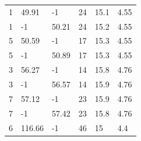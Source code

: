 \begin{table}[h!]
\begin{tabular*}{\linewidth}{p{45pt}<{\centering}p{65pt}<{\centering}
p{65pt}<{\centering}p{45pt}<{\centering}p{55pt}<{\centering}p{75pt}<{\centering}}
1 & 49.91 & -1 & 24 & 15.1 & 4.55 \\
1 & -1 & 50.21 & 24 & 15.2 & 4.55 \\
5 & 50.59 & -1 & 17 & 15.3 & 4.55 \\
5 & -1 & 50.89 & 17 & 15.3 & 4.55 \\
3 & 56.27 & -1 & 14 & 15.8 & 4.76 \\
3 & -1 & 56.57 & 14 & 15.9 & 4.76 \\
7 & 57.12 & -1 & 23 & 15.9 & 4.76 \\
7 & -1 & 57.42 & 23 & 15.8 & 4.76 \\
6 & 116.66 & -1 & 46 & 15 & 4.4 \\
\bottomrule
  \end{tabular*}
  \label{Ap4}
\end{table}
 




